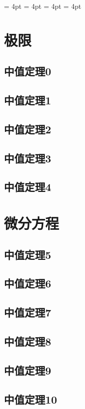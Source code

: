 \documentclass[no-math]{lecture}
\begin{document}
	\raggedbottom
	\abovedisplayshortskip = 4pt
	\belowdisplayshortskip = 4pt
	\abovedisplayskip 		 = 4pt
	\belowdisplayskip 		 = 4pt
	\frontmatter
		\tableofcontents
	\mainmatter
\newpage
	\chapter{极限}

	\newpage
	
	\newpage

	\section{中值定理0}
	\section{中值定理1}
	\section{中值定理2}
	\section{中值定理3}
	\section{中值定理4}
\newpage
	\chapter{微分方程}
	\section{中值定理5}
	\section{中值定理6}
	\section{中值定理7}
	\section{中值定理8}
	\section{中值定理9}
	\section{中值定理10}
\end{document}
